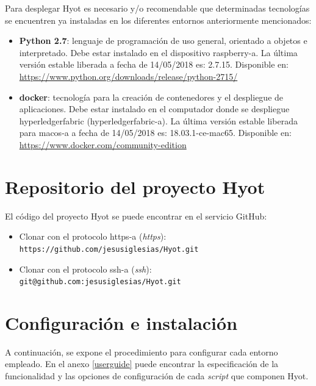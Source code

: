 \documentclass[12pt,a4paper, twoside]{report}
\begin{document}
	Para desplegar Hyot es necesario y/o recomendable que determinadas tecnologías se encuentren ya instaladas en los diferentes entornos anteriormente mencionados:
	
	\begin{itemize}
		\item \textbf{Python 2.7}: lenguaje de programación de uso general, orientado a objetos e interpretado. Debe estar instalado en el dispositivo \gls{raspberry-a}. La última versión estable liberada a fecha de {\color{red}14/05/2018} es: 2.7.15. Disponible en: \url{https://www.python.org/downloads/release/python-2715/}
		\item \textbf{\gls{docker}}: tecnología para la creación de contenedores y el despliegue de aplicaciones. Debe estar instalado en el computador donde se despliegue \gls{hyperledgerfabric} (\gls{hyperledgerfabric-a}). La última versión estable liberada para \gls{macos-a} a fecha de {\color{red}14/05/2018} es: 18.03.1-ce-mac65. Disponible en: \url{https://www.docker.com/community-edition}
	\end{itemize}
	
	\section{Repositorio del proyecto Hyot}
	
	El código del proyecto Hyot se puede encontrar en el servicio GitHub:
	
		\begin{itemize}
			\item Clonar con el protocolo \gls{https-a} (\textit{\gls{https}}): \newline \texttt{https://github.com/jesusiglesias/Hyot.git}
			\item Clonar con el protocolo \gls{ssh-a} (\textit{\gls{ssh}}): \newline \texttt{git@github.com:jesusiglesias/Hyot.git}
		\end{itemize}
	
	\section{Configuración e instalación}
	
	A continuación, se expone el procedimiento para configurar cada entorno empleado. En el anexo \ref{userguide} puede encontrar la especificación de la funcionalidad y las opciones de configuración de cada \textit{\gls{script}} que componen Hyot.
	
\end{document}
